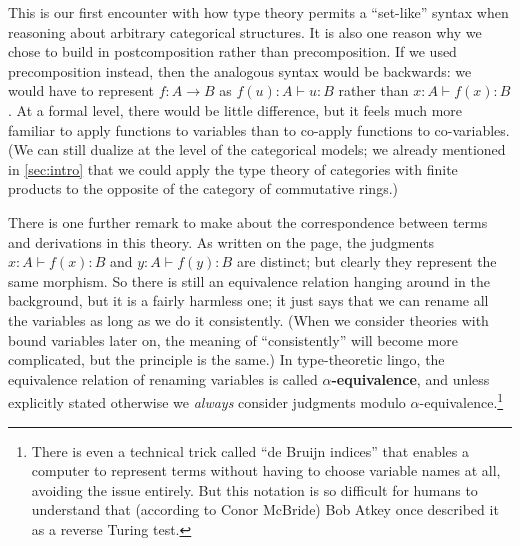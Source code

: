\documentclass{book}
\let\types\vdash
\begin{document}
This is our first encounter with how type theory permits a ``set-like'' syntax when reasoning about arbitrary categorical structures.
It is also one reason why we chose to build in postcomposition rather than precomposition.
If we used precomposition instead, then the analogous syntax would be backwards: we would have to represent $f:A\to B$ as $f(u):A \types u:B$ rather than $x:A \types f(x):B$.
At a formal level, there would be little difference, but it feels much more familiar to apply functions to variables than to co-apply functions to co-variables.
(We can still dualize at the level of the categorical models; we already mentioned in \cref{sec:intro} that we could apply the type theory of categories with finite products to the opposite of the category of commutative rings.)

There is one further remark to make about the correspondence between terms and derivations in this theory.
As written on the page, the judgments $x:A \types f(x):B$ and $y:A \types f(y):B$ are distinct; but clearly they represent the same morphism.
So there is still an equivalence relation hanging around in the background, but it is a fairly harmless one; it just says that we can rename all the variables as long as we do it consistently.
(When we consider theories with bound variables later on, the meaning of ``consistently'' will become more complicated, but the principle is the same.)
\label{sec:alpha}%
In type-theoretic lingo, the equivalence relation of renaming variables is called \textbf{$\alpha$-equivalence}, and unless explicitly stated otherwise we \emph{always} consider judgments modulo $\alpha$-equivalence.\footnote{There is even a technical trick called ``de Bruijn indices'' that enables a computer to represent terms without having to choose variable names at all, avoiding the issue entirely.  But this notation is so difficult for humans to understand that (according to Conor McBride) Bob Atkey once described it as a reverse Turing test.}
\end{document}
